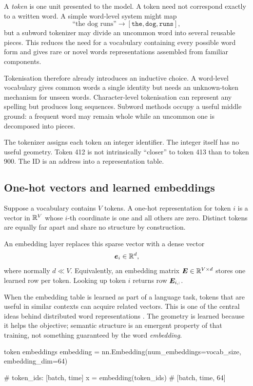 A \emph{token} is one unit presented to the model. A token need not correspond exactly to a written word. A simple word-level system might map
\[
  \text{``the dog runs''}
  \longrightarrow
  [\texttt{the},\texttt{dog},\texttt{runs}],
\]
but a subword tokenizer may divide an uncommon word into several reusable pieces. This reduces the need for a vocabulary containing every possible word form and gives rare or novel words representations assembled from familiar components.

Tokenisation therefore already introduces an inductive choice. A word-level vocabulary gives common words a single identity but needs an unknown-token mechanism for unseen words. Character-level tokenisation can represent any spelling but produces long sequences. Subword methods occupy a useful middle ground: a frequent word may remain whole while an uncommon one is decomposed into pieces.

The tokenizer assigns each token an integer identifier. The integer itself has no useful geometry. Token 412 is not intrinsically ``closer'' to token 413 than to token 900. The ID is an address into a representation table.

\subsection{One-hot vectors and learned embeddings}

Suppose a vocabulary contains \(V\) tokens. A one-hot representation for token \(i\) is a vector in \(\mathbb{R}^V\) whose \(i\)-th coordinate is one and all others are zero. Distinct tokens are equally far apart and share no structure by construction.

An embedding layer replaces this sparse vector with a dense vector
\[
  \bm{e}_i \in \mathbb{R}^d,
\]
where normally \(d \ll V\). Equivalently, an embedding matrix \(\bm{E}\in\mathbb{R}^{V\times d}\) stores one learned row per token. Looking up token \(i\) returns row \(\bm{E}_{i,:}\).

When the embedding table is learned as part of a language task, tokens that are useful in similar contexts can acquire related vectors. This is one of the central ideas behind distributed word representations \parencite{bengio2003,mikolov2013}. The geometry is learned because it helps the objective; semantic structure is an emergent property of that training, not something guaranteed by the word \emph{embedding}.

\begin{pytorchbox}{token embeddings}
embedding = nn.Embedding(num_embeddings=vocab_size,
                         embedding_dim=64)

# token_ids: [batch, time]
x = embedding(token_ids)       # [batch, time, 64]
\end{pytorchbox}

